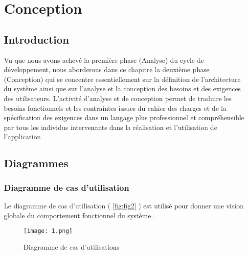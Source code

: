 
\setcounter{chapter}{1}
\chapter{Conception}
\minitoc %
\graphicspath{{Chapitre2/figures/}}


\pagestyle{fancy}
\fancyhf{}
\fancyhead[R]{\bfseries\rightmark}
\fancyfoot[R]{\thepage}
\renewcommand{\headrulewidth}{0.5pt}
\renewcommand{\footrulewidth}{0pt}
\renewcommand{\chaptermark}[1]{\markboth{\MakeUppercase{\chaptername~\thechapter. #1 }}{}}
\renewcommand{\sectionmark}[1]{\markright{\thechapter.\thesection~ #1}}

\begin{spacing}{1.2}

\section*{Introduction}
Vu que nous avons achevé la première phase (Analyse) du cycle de développement, nous aborderons dans ce chapitre la deuxième phase (Conception) qui se concentre essentiellement sur la définition de l’architecture du système ainsi que sur l’analyse et la conception des besoins et des exigences des utilisateurs.  L’activité d’analyse et de conception permet de traduire les besoins fonctionnels et les contraintes issues du cahier des charges et de la spécification des exigences dans un langage plus professionnel et compréhensible par tous les individus intervenants dans la réalisation et l’utilisation de l’application

\newpage
\section{Diagrammes}
\subsection{Diagramme de cas d'utilisation}
Le diagramme de cas d'utilisation ( \autoref{fig:fig2} ) est utilisé pour donner une vision globale du comportement fonctionnel du système .

\begin{figure}[H]\centering
\texttt{[image: 1.png]}
\caption{Diagramme de cas d'utilisations}
\label{fig:fig2}
\end{figure}





\end{spacing}
